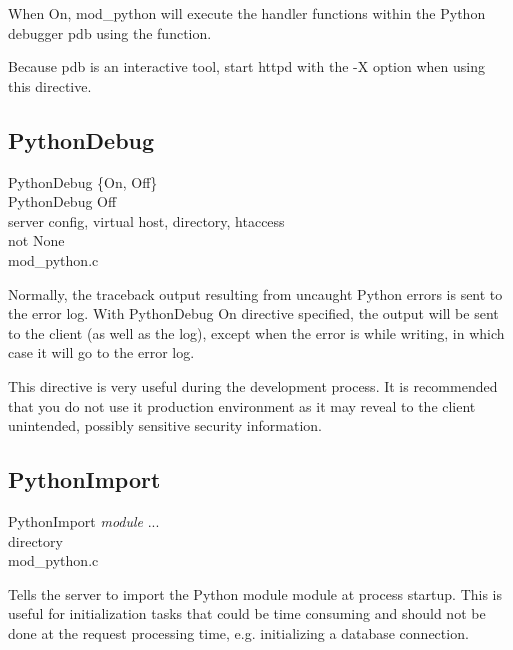 When On, mod_python will execute the handler functions within the
Python debugger pdb using the  function.

Because pdb is an interactive tool, start httpd with the -X option
when using this directive.

\subsection{PythonDebug\label{dir-other-pd}}

PythonDebug \{On, Off\} \\
PythonDebug Off\\
server config, virtual host, directory, htaccess\\
not None\\
mod_python.c

Normally, the traceback output resulting from uncaught Python errors
is sent to the error log. With PythonDebug On directive specified, the
output will be sent to the client (as well as the log), except when
the error is  while writing, in which case it will go
to the error log.

This directive is very useful during the development process. It is
recommended that you do not use it production environment as it may
reveal to the client unintended, possibly sensitive security
information.

\subsection{PythonImport\label{dir-other-pi}}

PythonImport \emph{module} ... \\
directory\\
mod_python.c

Tells the server to import the Python module module at process
startup. This is useful for initialization tasks that could be time
consuming and should not be done at the request processing time,
e.g. initializing a database connection.


